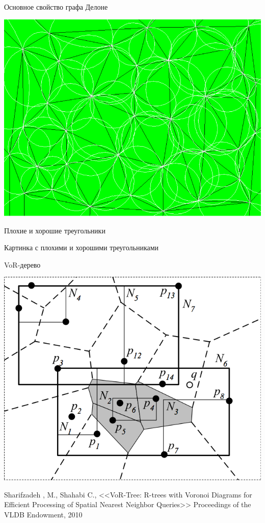 \documentclass[14pt, fleqn, xcolor={dvipsnames, table}]{beamer}
\begin{document}
        \begin{frame}{Основное свойство графа Делоне}
            \begin{center}
	            \includegraphics[scale = 0.33]{voronoi-4.png}
	        \end{center}       
        \end{frame}
        
        \begin{frame}{Плохие и хорошие треугольники}
            \begin{center}
	            Картинка с плохими и хорошими треугольниками
	        \end{center}       
        \end{frame}
        
        \begin{frame}{VoR-дерево}
            \begin{center}
	            \includegraphics[scale = 0.3]{vor-tree.png}
	            
	            {\tiny Sharifzadeh , M., Shahabi C., <<VoR-Tree: R-trees with Voronoi Diagrams for Efficient Processing of Spatial Nearest Neighbor Queries>> Proceedings of the VLDB Endowment, 2010}	  
	        \end{center}   
        \end{frame}
        
\end{document}
